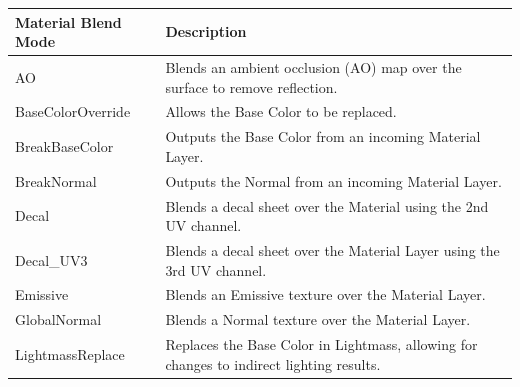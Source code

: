 \begin{table}
	\caption{Different Layered Material Blend Types in \emph{UE4}. Source: \cite{epic2015LayeredMats}.  }
	\label{table:layeredMaterialBlendTypes}
	\begin{longtable}{|p{3.5cm}|p{9.5cm}|}
		\hline
		\small
		Material Blend Mode                 &Description                                                                                                                                                                                                                                                                                                                                                \\ \hline
		AO 				  &Blends an ambient occlusion (AO) map over the surface to remove reflection.																					\\ \hline
		BaseColorOverride &Allows the Base Color to be replaced.                                                                                                                        \\ \hline
		BreakBaseColor    & Outputs the Base Color from an incoming Material Layer.                                                                                                       \\ \hline
		BreakNormal       & Outputs the Normal from an incoming Material Layer.                                                                                                          \\ \hline
		Decal             & Blends a decal sheet over the Material using the 2nd UV channel.                                                                                             \\ \hline
		Decal\_UV3        & Blends a decal sheet over the Material Layer using the 3rd UV channel.                                                                                       \\ \hline
		Emissive          & Blends an Emissive texture over the Material Layer.                                                                                                          \\ \hline
		GlobalNormal      & Blends a Normal texture over the Material Layer.                                                                                                             \\ \hline
		LightmassReplace  & Replaces the Base Color in Lightmass, allowing for changes to indirect lighting results.                                                                      \\ \hline

\end{longtable}
\end{table}
